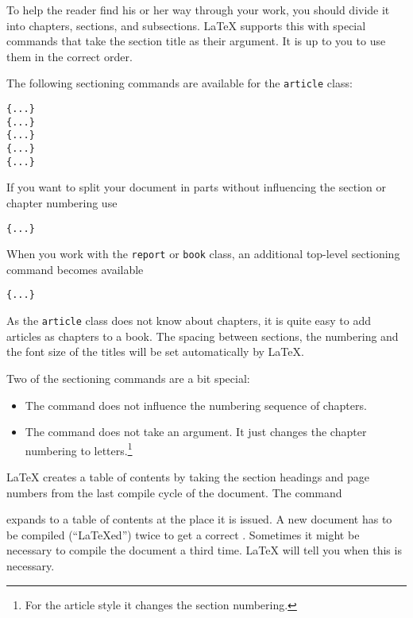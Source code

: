 To help the reader find his or her way through your work, you should
divide it into chapters, sections, and subsections.  \LaTeX{} supports
this with special commands that take the section title as their
argument.  It is up to you to use them in the correct order.

The following sectioning commands are available for the
\texttt{article} class: \nopagebreak

\begin{lscommand}
\verb|{...}|\\
\verb|{...}|\\
\verb|{...}|\\
\verb|{...}|\\
\verb|{...}|
\end{lscommand}

If you want to split your document in parts without influencing the
section or chapter numbering use
\begin{lscommand}
\verb|{...}|
\end{lscommand}

When you work with the \texttt{report} or \texttt{book} class,
an additional top-level sectioning command becomes available
\begin{lscommand}
\verb|{...}|
\end{lscommand}

As the \texttt{article} class does not know about chapters, it is quite easy
to add articles as chapters to a book.
The spacing between sections, the numbering and the font size of the
titles will be set automatically by \LaTeX. 

Two of the sectioning commands are a bit special: 
\begin{itemize}
\item The  command does
  not influence the numbering sequence of chapters.  
\item The  command does not take an argument. It just
  changes the chapter numbering to letters.\footnote{For the article
    style it changes the section numbering.}
\end{itemize}



\LaTeX{} creates a table of contents by taking the section headings
and page numbers from the last compile cycle of the document. The command 
\begin{lscommand} 
\end{lscommand} 
\noindent expands to a table of contents at the place it
is issued. A new
document has to be compiled (``\LaTeX ed'') twice to get a
correct . Sometimes it might be
necessary to compile the document a third time. \LaTeX{} will tell you
when this is necessary.


